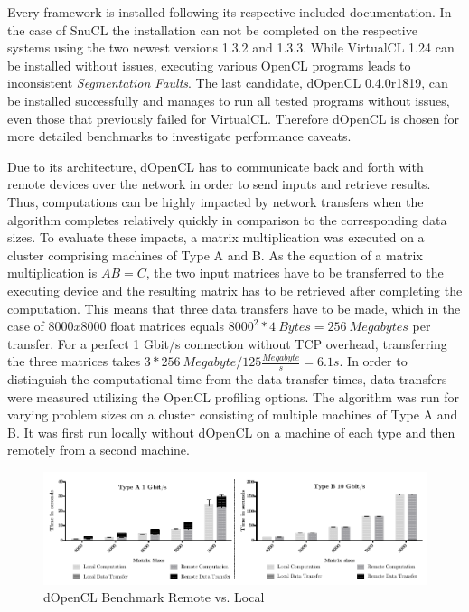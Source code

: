 Every framework is installed following its respective included documentation. In the case of SnuCL the installation can not be completed on the respective systems using the two newest versions 1.3.2 and 1.3.3. While VirtualCL 1.24 can be installed without issues, executing various OpenCL programs leads to inconsistent \textit{Segmentation Faults}. The last candidate, dOpenCL 0.4.0r1819, can be installed successfully and manages to run all tested programs without issues, even those that previously failed for VirtualCL. Therefore dOpenCL is chosen for more detailed benchmarks to investigate performance caveats.

Due to its architecture, dOpenCL has to communicate back and forth with remote devices over the network in order to send inputs and retrieve results. Thus, computations can be highly impacted by network transfers when the algorithm completes relatively quickly in comparison to the corresponding data sizes. To evaluate these impacts, a matrix multiplication was executed on a cluster comprising machines of Type A and B. As the equation of a matrix multiplication is $AB = C$, the two input matrices have to be transferred to the executing device and the resulting matrix has to be retrieved after completing the computation. This means that three data transfers have to be made, which in the case of $8000x8000$ float matrices equals $8000^2 * 4\ Bytes = 256\ Megabytes$ per transfer. For a perfect 1 Gbit/s connection without TCP overhead, transferring the three matrices takes $3*256\ Megabyte / 125\frac{Megabyte}{s} = 6.1s$. In order to distinguish the computational time from the data transfer times, data transfers were measured utilizing the OpenCL profiling options. The algorithm was run for varying problem sizes on a cluster consisting of multiple machines of Type A and B. It was first run locally without dOpenCL on a machine of each type and then remotely from a second machine.

\begin{figure}[!htb]

\includegraphics[width=1.0\textwidth]{images/data_transfer.pdf}
\centering
\caption{dOpenCL Benchmark Remote vs. Local}
\label{img:data_transfer}
\end{figure}

